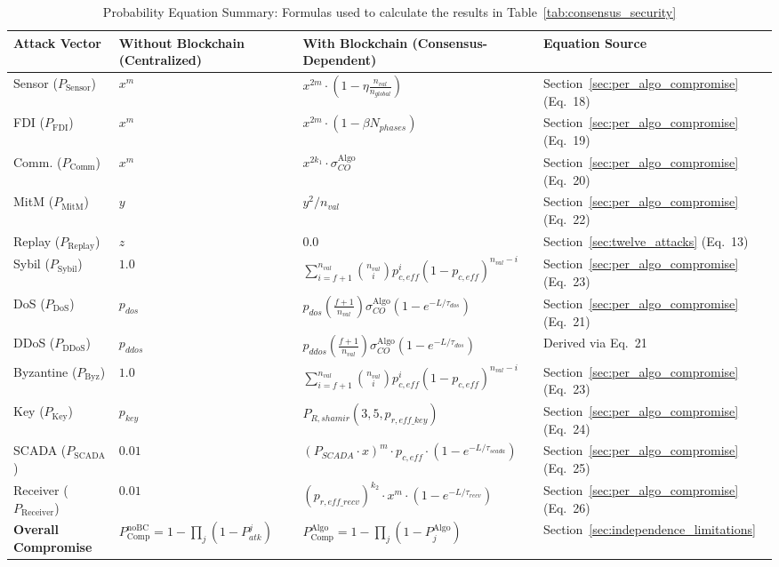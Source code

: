 \documentclass[10pt,twocolumn,journal]{IEEEtran}
\begin{document}
\begin{table}[t]
\caption{Probability Equation Summary: Formulas used to calculate the results in Table~\ref{tab:consensus_security}}
\label{tab:probability_equations_summary}
\centering
\scriptsize
\begin{tabular}{@{}llll@{}}
\toprule
\textbf{Attack Vector} & \textbf{Without Blockchain (Centralized)} & \textbf{With Blockchain (Consensus-Dependent)} & \textbf{Equation Source} \\
\midrule
Sensor ($P_{\mathrm{Sensor}}$) & $x^m$ & $x^{2m} \cdot (1 - \eta \frac{n_{val}}{n_{global}})$ & Section~\ref{sec:per_algo_compromise} (Eq.~18) \\
FDI ($P_{\mathrm{FDI}}$) & $x^m$ & $x^{2m} \cdot (1 - \beta N_{phases})$ & Section~\ref{sec:per_algo_compromise} (Eq.~19) \\
Comm. ($P_{\mathrm{Comm}}$) & $x^m$ & $x^{2k_1} \cdot \sigma_{CO}^{\text{Algo}}$ & Section~\ref{sec:per_algo_compromise} (Eq.~20) \\
MitM ($P_{\mathrm{MitM}}$) & $y$ & $y^2 / n_{val}$ & Section~\ref{sec:per_algo_compromise} (Eq.~22) \\
Replay ($P_{\mathrm{Replay}}$) & $z$ & $0.0$ & Section~\ref{sec:twelve_attacks} (Eq.~13) \\
Sybil ($P_{\mathrm{Sybil}}$) & $1.0$ & $\sum_{i=f+1}^{n_{val}} \binom{n_{val}}{i} p_{c,eff}^i (1 - p_{c,eff})^{n_{val}-i}$ & Section~\ref{sec:per_algo_compromise} (Eq.~23) \\
DoS ($P_{\mathrm{DoS}}$) & $p_{dos}$ & $p_{dos} (\frac{f+1}{n_{val}}) \sigma_{CO}^{\text{Algo}} (1 - e^{-L / \tau_{dos}})$ & Section~\ref{sec:per_algo_compromise} (Eq.~21) \\
DDoS ($P_{\mathrm{DDoS}}$) & $p_{ddos}$ & $p_{ddos} (\frac{f+1}{n_{val}}) \sigma_{CO}^{\text{Algo}} (1 - e^{-L / \tau_{dos}})$ & Derived via Eq.~21 \\
Byzantine ($P_{\mathrm{Byz}}$) & $1.0$ & $\sum_{i=f+1}^{n_{val}} \binom{n_{val}}{i} p_{c,eff}^i (1 - p_{c,eff})^{n_{val}-i}$ & Section~\ref{sec:per_algo_compromise} (Eq.~23) \\
Key ($P_{\mathrm{Key}}$) & $p_{key}$ & $P_{R,shamir}(3, 5, p_{r,eff\_key})$ & Section~\ref{sec:per_algo_compromise} (Eq.~24) \\
SCADA ($P_{\mathrm{SCADA}}$) & $0.01$ & $(P_{SCADA} \cdot x)^m \cdot p_{c,eff} \cdot (1 - e^{-L / \tau_{scada}})$ & Section~\ref{sec:per_algo_compromise} (Eq.~25) \\
Receiver ($P_{\mathrm{Receiver}}$) & $0.01$ & $(p_{r,eff\_recv})^{k_2} \cdot x^m \cdot (1 - e^{-L / \tau_{recv}})$ & Section~\ref{sec:per_algo_compromise} (Eq.~26) \\
\midrule
\textbf{Overall Compromise} & $P_{\mathrm{Comp}}^{\mathrm{noBC}} = 1 - \prod_{j} (1 - P_{atk}^j)$ & $P_{\mathrm{Comp}}^{\mathrm{Algo}} = 1 - \prod_{j} (1 - P_j^{\text{Algo}})$ & Section~\ref{sec:independence_limitations} \\
\bottomrule
\end{tabular}
\end{table}
\end{document}
